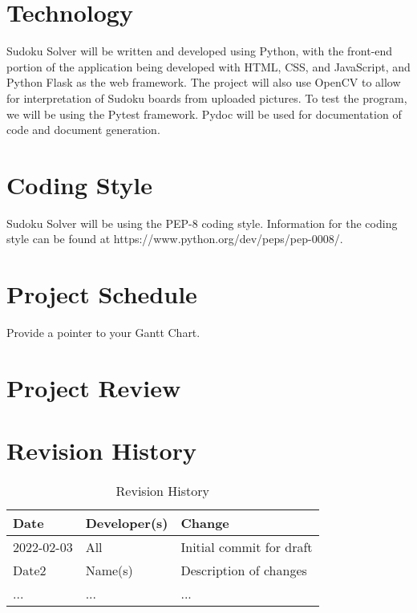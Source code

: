 \documentclass[11pt]{article}
\begin{document}
\section{Technology}

Sudoku Solver will be written and developed using Python, with the front-end portion of the application being developed with HTML, CSS, and JavaScript, and Python Flask as the web framework. The project will also use OpenCV to allow for interpretation of Sudoku boards from uploaded pictures. To test the program, we will be using the Pytest framework. Pydoc will be used for documentation of code and document generation.

\section{Coding Style}

Sudoku Solver will be using the PEP-8 coding style. Information for the coding style can be found at https://www.python.org/dev/peps/pep-0008/. 

\section{Project Schedule}

Provide a pointer to your Gantt Chart.

\section{Project Review}

\section{Revision History}
\begin{table}[hp]
\caption{Revision History} \label{TblRevisionHistory}
\begin{tabularx}{\textwidth}{llX}
\toprule
\textbf{Date} & \textbf{Developer(s)} & \textbf{Change}\\
\midrule
2022-02-03 & All & Initial commit for draft\\
Date2 & Name(s) & Description of changes\\
... & ... & ...\\
\bottomrule
\end{tabularx}
\end{table}
\end{document}
